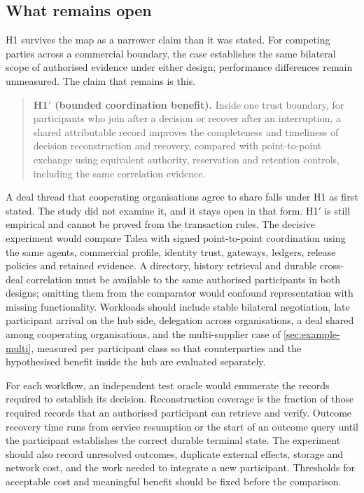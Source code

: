 \subsection{What remains open}

H1 survives the map as a narrower claim than it was stated. For competing parties across a commercial boundary, the case establishes the same bilateral scope of authorised evidence under either design; performance differences remain unmeasured. The claim that remains is this.

\begin{quote}
\textbf{H1$'$ (bounded coordination benefit).} Inside one trust boundary, for participants who join after a decision or recover after an interruption, a shared attributable record improves the completeness and timeliness of decision reconstruction and recovery, compared with point-to-point exchange using equivalent authority, reservation and retention controls, including the same correlation evidence.
\end{quote}

A deal thread that cooperating organisations agree to share falls under H1 as first stated. The study did not examine it, and it stays open in that form. H1$'$ is still empirical and cannot be proved from the transaction rules. The decisive experiment would compare Talea with signed point-to-point coordination using the same agents, commercial profile, identity trust, gateways, ledgers, release policies and retained evidence. A directory, history retrieval and durable cross-deal correlation must be available to the same authorised participants in both designs; omitting them from the comparator would confound representation with missing functionality. Workloads should include stable bilateral negotiation, late participant arrival on the hub side, delegation across organisations, a deal shared among cooperating organisations, and the multi-supplier case of \cref{sec:example-multi}, measured per participant class so that counterparties and the hypothesised benefit inside the hub are evaluated separately.

For each workflow, an independent test oracle would enumerate the records required to establish its decision. Reconstruction coverage is the fraction of those required records that an authorised participant can retrieve and verify. Outcome recovery time runs from service resumption or the start of an outcome query until the participant establishes the correct durable terminal state. The experiment should also record unresolved outcomes, duplicate external effects, storage and network cost, and the work needed to integrate a new participant. Thresholds for acceptable cost and meaningful benefit should be fixed before the comparison.

